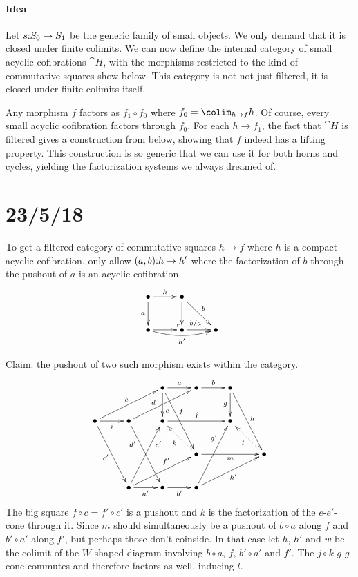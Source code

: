 \documentclass[csh.tex]{subfiles}
\makeatletter
\newcommand\pushout{\ar@{}[dr]|(.9)\ulcorner}
\makeatother
\begin{document}
\paragraph{Idea}
Let $s\mathord : S_0\to S_1$ be the generic family of small objects. We only demand that it is closed under finite colimits. We can now define the internal category of small acyclic cofibrations $\cat H$, with the morphisms restricted to the kind of commutative squares show below. This category is not not just filtered, it is closed under finite colimits itself.

Any morphism $f$ factors as $f_1\circ f_0$ where $f_0 = \colim_{h\to f} h$. Of course, every small acyclic cofibration factors through $f_0$. For each $h\to f_1$, the fact that $\cat H$ is filtered gives a construction from below, showing that $f$ indeed has a lifting property. This construction is so generic that we can use it for both horns and cycles, yielding the factorization systems we always dreamed of.

\section{23/5/18}
To get a filtered category of commutative squares $h\to f$ where $h$ is a compact acyclic cofibration, only allow $(a,b)\mathord : h\to h'$ where the factorization of $b$ through the pushout of $a$ is an acyclic cofibration.
\[\xymatrix{
\bullet \ar[r]^h\ar[d]_a\pushout & \bullet\ar[d]\ar[dr]^b \\
\bullet \ar[r]\ar@/_/[rr]_{h'} & \bullet \ar[r]^(.4){b/a} & \bullet
}\]

Claim: the pushout of two such morphism exists within the category.
\[\xymatrix{
&& \bullet \ar[r]^a\ar[ddr]^(.4)f\ar[d]^(.7)e & \bullet\ar[r]^b & \bullet \ar[ddr]^h \ar[d]_g\\
\bullet\ar[r]_i\ar[urr]^c\ar[ddr]_{c'} &\bullet\ar[urr]^(.4)d\ar[ddr]_(.3){d'} &
\bullet\ar[rr]^j && \bullet\\
&&&\bullet\ar[rr]_m\ar@{.>}[ul]^k &&\bullet\ar@{.>}[ul]^l \\
& \bullet \ar[r]_{a'}\ar[urr]^(.6){f'}\ar[uur]_(.7){e'} & \bullet\ar[r]_{b'} & \bullet \ar[urr]_{h'}\ar[uur]^(.7){g'}
}\]
The big square $f\circ c = f'\circ c'$ is a pushout and $k$ is the factorization of the $e$-$e'$-cone through it. Since $m$ should simultaneously be a pushout of $b\circ a$ along $f$ and $b'\circ a'$ along $f'$, but perhaps those don't coinside. In that case let $h$, $h'$ and $w$ be the colimit of the $W$-shaped diagram involving $b\circ a$, $f$, $b'\circ a'$ and $f'$. The $j\circ k$-$g$-$g$-cone commutes and therefore factors as well, inducing $l$. 
\end{document}

